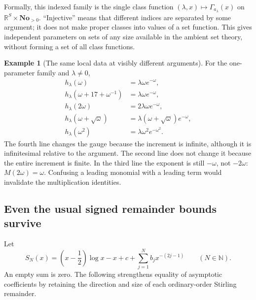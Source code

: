 \documentclass[11pt,letterpaper]{article}
\numberwithin{equation}{section}
\theoremstyle{plain}
\theoremstyle{definition}
\newtheorem{example}[example]{Example}
\theoremstyle{remark}
\newcommand{\No}{\mathbf{No}}
\newcommand{\R}{\mathbb R}
\newcommand{\N}{\mathbb N}
\begin{document}
Formally, this indexed family is the single class function
$(\lambda,x)\mapsto\Gamma_{a_\lambda}(x)$ on
$\R^S\times\No_{>0}$. ``Injective'' means that different indices are
separated by some argument; it does not make proper classes into values of
a set function. This gives independent parameters on sets of any size
available in the ambient set theory, without forming a set of all class
functions.

\begin{example}[The same local data at visibly different arguments]
For the one-parameter family and $\lambda\ne0$,
\begin{align*}
 h_\lambda(\omega)&=\lambda\omega e^{-\omega},\\
 h_\lambda(\omega+17+\omega^{-1})&=\lambda\omega e^{-\omega},\\
 h_\lambda(2\omega)&=2\lambda\omega e^{-\omega},\\
 h_\lambda(\omega+\sqrt\omega)&=
 \lambda(\omega+\sqrt\omega)e^{-\omega},\\
 h_\lambda(\omega^2)&=\lambda\omega^2e^{-\omega^2}.
\end{align*}
The fourth line changes the gauge because the increment is infinite,
although it is infinitesimal relative to the argument. The second line does
not change it because the entire increment is finite. In the third line the
exponent is still $-\omega$, not $-2\omega$: $M(2\omega)=\omega$.
Confusing a leading monomial with a leading term would invalidate the
multiplication identities.
\end{example}

\subsection{Even the usual signed remainder bounds survive}
Let
\begin{equation}\label{eq:stirling-truncation}
 S_N(x)=\left(x-\frac12\right)\log x-x+c+
 \sum_{j=1}^{N}b_jx^{-(2j-1)}\qquad(N\in\N).
\end{equation}
An empty sum is zero. The following strengthens equality of asymptotic
coefficients by retaining the direction and size of each ordinary-order
Stirling remainder.
\end{document}
